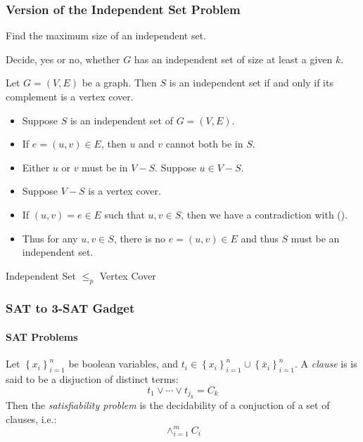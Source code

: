 \subsubsection{Version of the Independent Set Problem}
\begin{prob}\label{prob:ncpi-3}%
Find the maximum size of an independent set.
\end{prob} 
\begin{prob}\label{prob:ncpi-4}%
Decide, yes or no, whether $G$ has an independent set of size at least a given $k$.
\end{prob} 
\begin{thm}\label{thm:ncpi-2}
Let $G=(V,E)$ be a graph.  Then $S$ is an independent set if and only if its complement is a vertex cover.
\end{thm} 
\begin{itemize}
\item[\rn{1}]Suppose $S$ is an independent set of $G = (V,E)$. 
\item[\rn{2}]If $e = (u,v) \in E$, then $u$ and $v$ cannot both be in $S$. 
\item[\rn{3}]Either $u$ or $v$ must be in $V-S$.  Suppose $u \in V-S$.
\end{itemize}  
\begin{itemize}
\item[\rn{1}]Suppose $V-S$ is a vertex cover.
\item[\rn{2}]If $(u,v) = e \in E$ such that $u,v \in S$,  then we have a contradiction with ().
\item[\rn{3}]Thus for any $u,v \in S$, there is no $e = (u,v) \in E$ and thus $S$ must be an independent set.
\end{itemize}  
\begin{thm}\label{thm}
Independent Set $\leq_p$ Vertex Cover
\end{thm} 

\subsubsection{SAT to 3-SAT Gadget}
\paragraph{SAT Problems}
\begin{prob}\label{prob:ncpi-6}%
Let $\left\lbrace x_i \right\rbrace_{i=1}^{n} $ be boolean variables, and $t_i \in \left\lbrace x_i\right\rbrace_{i=1}^{n}  \cup \left\lbrace \bar{x}_i\right\rbrace_{i=1}^{n}   $.  A \textit{clause} is is said to be a disjuction of distinct terms:
$$
t_1 \vee \cdots \vee t_{j_k} = C_k
$$
Then the \textit{satisfiability problem} is the decidability of a conjuction of a set of clauses, i.e.:
$$ \wedge_{i=1}^m C_i$$
\end{prob} 
